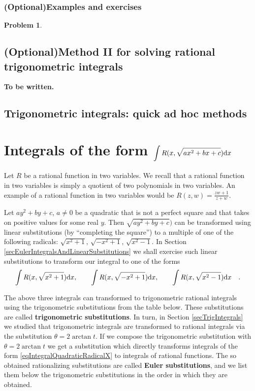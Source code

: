 \documentclass[12pt]{book}
\newtheorem{problem}[theorem]{Problem}
\newcommand{\optionalMaterial}{\textbf{(Optional)}}
\renewcommand{\emph}{\textbf}
\begin{document}
\subsubsection{\optionalMaterial Examples and exercises}
\begin{problem}

\end{problem}





\subsection{\optionalMaterial Method II for solving rational trigonometric integrals}
\textbf{To be written.}


\subsection{Trigonometric integrals: quick ad hoc methods}

\section{Integrals of the form $\displaystyle \int R(x, \sqrt{ax^2+bx+c}) {\normalfont \text{d}} x$}
Let $R$ be a rational function in two variables. We recall that a rational function in two variables is simply a quotient of two polynomials in two variables. An example of a rational function in two variables would be $R(z,w)= \frac{zw+1}{z+w}$.

Let $ay^2+by+c$, $a\neq 0$ be a quadratic that is not a perfect square and that takes on positive values for some real $y$. Then $\sqrt{ay^2+by+c})$ can be transformed using linear substitutions (by ``completing the square'') to a multiple of one of the following radicals: $\sqrt{x^2+1}$, $\sqrt{-x^2+1}$,  $\sqrt{x^2-1}$. In Section \ref{secEulerIntegralsAndLinearSubstitutions} we shall exercise such linear substitutions to transform our integral to one of the forms
\begin{equation}\label{eqIntegralQuadraticRadicalX}
\int R(x, \sqrt{x^2+1}){\normalfont \text{d}} x,\qquad  \int R(x, \sqrt{-x^2+1}){\normalfont \text{d}} x, \qquad  \int R(x, \sqrt{x^2-1}){\normalfont \text{d}} x\quad .
\end{equation}

The above three integrals can transformed to trigonometric rational integrals using the trigonometric substitutions from the table below. These substitutions are called \emph{trigonometric  substitutions}. In turn, in Section \ref{secTrigIntegrals} we studied that trigonometric integrals are transformed to rational integrals via the substitution $\theta=2\arctan t$. If we compose the  trigonometric substitution with $\theta=2\arctan t$ we get a substitution which directly transforms integrals of the form \eqref{eqIntegralQuadraticRadicalX} to integrals of rational functions. The so obtained rationalizing substitutions are called \emph{Euler substitutions}, and we list them below the trigonometric substitutions in the order in which they are obtained.
\end{document}
